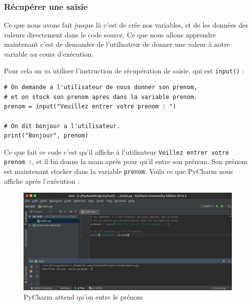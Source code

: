 \documentclass[12pt]{article}
\newcommand{\code}[1]{\colorbox{light-gray}{\texttt{#1}}}
\begin{document}
        \subsubsection{Récupérer une saisie}
            Ce que nous avons fait jusque là c'est de crée nos variables, et de les données des valeurs directement dans
            le code source. Ce que nous allons apprendre maintenant c'est de demander de l'utilisateur
            de donner une valeur à notre variable au cours d'exécution.

            Pour cela on va utiliser l'instruction de récupération de saisie, qui est \code{input()} :
            \begin{lstlisting}[style=code]
# On demande a l'utilisateur de nous donner son prenom,
# et on stock son prenom apres dans la variable prenom.
prenom = input("Veuillez entrer votre prenom : ")

# On dit bonjour a l'utilisateur.
print("Bonjour", prenom)
            \end{lstlisting}

            Ce que fait ce code c'est qu'il affiche à l'utilisateur \code{Veillez entrer votre prenom :}, et il lui
            donne la main après pour qu'il entre son prénom. Son prénom est maintenant stocker dans la variable
            \code{prenom}. Voila ce que PyCharm nous affiche après l'exécution :
            \begin{figure}[H]
                \centering
                \includegraphics[width=\linewidth]{img/16_input.png}
                \caption{PyCharm attend qu'on entre le prénom}
            \end{figure}
\end{document}
